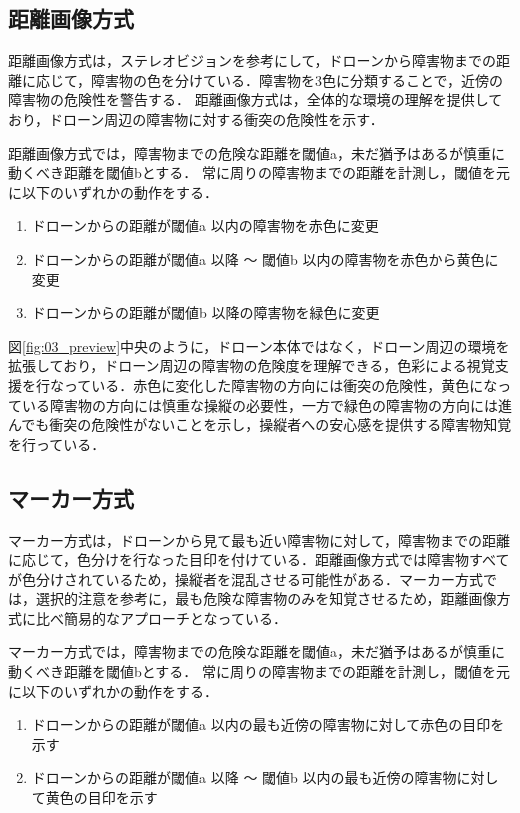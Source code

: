 \documentclass[submit,techrep]{ipsj}
\begin{document}
\subsection{距離画像方式}
距離画像方式は，ステレオビジョンを参考にして，ドローンから障害物までの距離に応じて，障害物の色を分けている．障害物を3色に分類することで，近傍の障害物の危険性を警告する．
距離画像方式は，全体的な環境の理解を提供しており，ドローン周辺の障害物に対する衝突の危険性を示す．
\par
距離画像方式では，障害物までの危険な距離を閾値a，未だ猶予はあるが慎重に動くべき距離を閾値bとする．
常に周りの障害物までの距離を計測し，閾値を元に以下のいずれかの動作をする．

\begin{enumerate}
	\item ドローンからの距離が閾値a 以内の障害物を赤色に変更
    
    \item ドローンからの距離が閾値a 以降 〜 閾値b 以内の障害物を赤色から黄色に変更
    
    \item ドローンからの距離が閾値b 以降の障害物を緑色に変更
\end{enumerate}

図\ref{fig:03_preview}中央のように，ドローン本体ではなく，ドローン周辺の環境を拡張しており，ドローン周辺の障害物の危険度を理解できる，色彩による視覚支援を行なっている．赤色に変化した障害物の方向には衝突の危険性，黄色になっている障害物の方向には慎重な操縦の必要性，一方で緑色の障害物の方向には進んでも衝突の危険性がないことを示し，操縦者への安心感を提供する障害物知覚を行っている．



\subsection{マーカー方式}
マーカー方式は，ドローンから見て最も近い障害物に対して，障害物までの距離に応じて，色分けを行なった目印を付けている．距離画像方式では障害物すべてが色分けされているため，操縦者を混乱させる可能性がある．マーカー方式では，選択的注意を参考に，最も危険な障害物のみを知覚させるため，距離画像方式に比べ簡易的なアプローチとなっている．
\par
マーカー方式では，障害物までの危険な距離を閾値a，未だ猶予はあるが慎重に動くべき距離を閾値bとする．
常に周りの障害物までの距離を計測し，閾値を元に以下のいずれかの動作をする．

\begin{enumerate}
	\item ドローンからの距離が閾値a 以内の最も近傍の障害物に対して赤色の目印を示す
    
    \item ドローンからの距離が閾値a 以降 〜 閾値b 以内の最も近傍の障害物に対して黄色の目印を示す
\end{enumerate}
\end{document}
